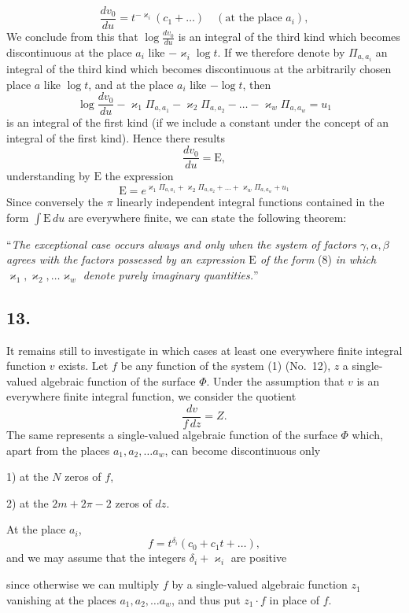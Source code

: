 \documentclass{article}
\begin{document}
\[
\frac{dv_0}{du} = t^{-\varkappa_i}(c_1 + \dots) \quad (\text{at the place } a_i),
\]
We conclude from this that $\log\frac{dv_0}{du}$ is an integral of the third kind which becomes discontinuous at the place $a_i$ like $-\varkappa_i\log t$. If we therefore denote by $\Pi_{a, a_i}$ an integral of the third kind which becomes discontinuous at the arbitrarily chosen place $a$ like $\log t$, and at the place $a_i$ like $-\log t$, then
\[
\log\frac{dv_0}{du} - \varkappa_1 \Pi_{a, a_1} - \varkappa_2 \Pi_{a, a_2} - \dots - \varkappa_w \Pi_{a, a_w} = u_1
\]
is an integral of the first kind (if we include a constant under the concept of an integral of the first kind). Hence there results
\[
\frac{dv_0}{du} = \mathrm{E}, \tag{7}
\]
understanding by $\mathrm{E}$ the expression
\[
\mathrm{E} = e^{\varkappa_1 \Pi_{a, a_1} + \varkappa_2 \Pi_{a, a_2} + \dots + \varkappa_w \Pi_{a, a_w} + u_1} \tag{8}
\]
Since conversely the $\pi$ linearly independent integral functions contained in the form $\displaystyle\int \mathrm{E}\,du$ are everywhere finite, we can state the following theorem:

``\emph{The exceptional case occurs always and only when the system of factors $\gamma, \alpha, \beta$ agrees with the factors possessed by an expression $\mathrm{E}$ of the form} (8) \emph{in which $\varkappa_1, \varkappa_2, \dots \varkappa_w$ denote purely imaginary quantities.}''

\subsection*{13.}

It remains still to investigate in which cases at least one everywhere finite integral function $v$ exists. Let $f$ be any function of the system (1) (No.~12), $z$ a single-valued algebraic function of the surface $\Phi$. Under the assumption that $v$ is an everywhere finite integral function, we consider the quotient
\[
\frac{dv}{f\,dz} = Z. \tag{1}
\]
The same represents a single-valued algebraic function of the surface $\Phi$ which, apart from the places $a_1, a_2, \dots a_w$, can become discontinuous only

1) at the $N$ zeros of $f$,

2) at the $2m+2\pi-2$ zeros of $dz$.

At the place $a_i$,
\[
f = t^{\delta_i}(c_0 + c_1 t + \dots),
\]
and we may assume that the integers $\delta_i + \varkappa_i$ are positive

since otherwise we can multiply $f$ by a single-valued algebraic function $z_1$ vanishing at the places $a_1, a_2, \dots a_w$, and thus put $z_1 \cdot f$ in place of $f$.
\end{document}
